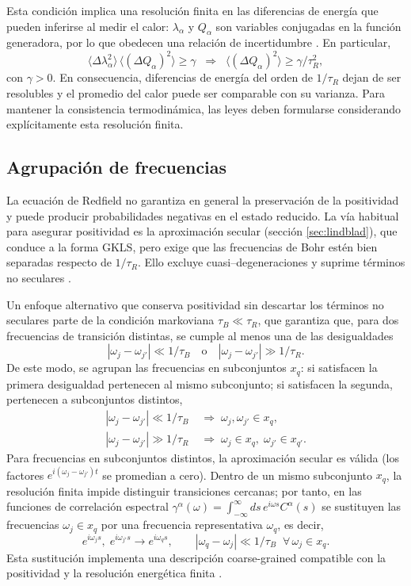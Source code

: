 Esta condición implica una resolución finita en las diferencias de energía que pueden inferirse al medir el calor: \(\lambda_{\alpha}\) y \(Q_{\alpha}\) son variables conjugadas en la función generadora, por lo que obedecen una relación de incertidumbre \cite{folland1997uncertainty}. En particular,
\[
    \langle \Delta \lambda^{2}_{\alpha} \rangle\,\langle (\Delta Q_{\alpha})^{2}\rangle \ge \gamma
    \;\;\Rightarrow\;\;
    \langle (\Delta Q_{\alpha})^{2}\rangle \ge \gamma/\tau_{R}^{2},
\]
con \(\gamma>0\). En consecuencia, diferencias de energía del orden de \(1/\tau_{R}\) dejan de ser resolubles y el promedio del calor puede ser comparable con su varianza. Para mantener la consistencia termodinámica, las leyes deben formularse considerando explícitamente esta resolución finita.
\label{sec2:finiteresol}

\subsection{Agrupación de frecuencias}

La ecuación de Redfield no garantiza en general la preservación de la positividad y puede producir probabilidades negativas en el estado reducido. La vía habitual para asegurar positividad es la aproximación secular (sección \ref{sec:lindblad}), que conduce a la forma GKLS, pero exige que las frecuencias de Bohr estén bien separadas respecto de \(1/\tau_{R}\). Ello excluye cuasi–degeneraciones y suprime términos no seculares \cite{trushechkin2021unified}.

Un enfoque alternativo que conserva positividad sin descartar los términos no seculares parte de la condición markoviana \(\tau_{B}\ll \tau_{R}\), que garantiza que, para dos frecuencias de transición distintas, se cumple al menos una de las desigualdades
\[
|\omega_j-\omega_{j'}|\ll 1/\tau_B
\quad\text{o}\quad
|\omega_j-\omega_{j'}|\gg 1/\tau_R.
\]
De este modo, se agrupan las frecuencias en subconjuntos \(x_q\): si satisfacen la primera desigualdad pertenecen al mismo subconjunto; si satisfacen la segunda, pertenecen a subconjuntos distintos,
\begin{align*}
    |\omega_{j}-\omega_{j'}| \ll 1/\tau_{B}  &\;\Rightarrow\; \omega_{j},\omega_{j'} \in x_{q}, \\
    |\omega_{j}-\omega_{j'}| \gg 1/\tau_{R}  &\;\Rightarrow\; \omega_{j} \in x_{q},\; \omega_{j'} \in x_{q'}.
\end{align*}
Para frecuencias en subconjuntos distintos, la aproximación secular es válida (los factores \(e^{i(\omega_j-\omega_{j'})t}\) se promedian a cero). Dentro de un mismo subconjunto \(x_q\), la resolución finita impide distinguir transiciones cercanas; por tanto, en las funciones de correlación espectral
\(\gamma^{\alpha}(\omega)=\int_{-\infty}^{\infty} ds\,e^{i\omega s}C^{\alpha}(s)\)
se sustituyen las frecuencias \(\omega_{j}\in x_q\) por una frecuencia representativa \(\omega_{q}\), es decir,
\[
    e^{i\omega_{j}s},\;e^{i\omega_{j'}s} \to e^{i\omega_{q}s},
    \qquad 
    |\omega_{q}-\omega_{j}|\ll 1/\tau_{B}\;\;\forall\,\omega_{j}\in x_{q}.
\]
Esta sustitución implementa una descripción coarse-grained compatible con la positividad y la resolución energética finita \cite{chruscinski2017brief}.

